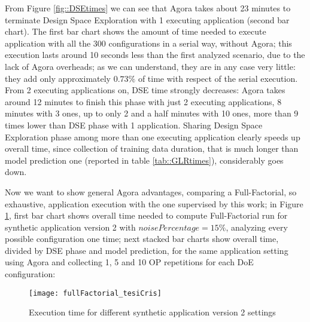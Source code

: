 From Figure \ref{fig::DSEtimes} we can see that Agora takes about 23 minutes to terminate Design Space Exploration with 1 executing application (second bar chart). The first bar chart shows the amount of time needed to execute application with all the 300 configurations in a serial way, without Agora; this execution lasts around 10 seconds less than the first analyzed scenario, due to the lack of Agora overheads; as we can understand, they are in any case very little: they add only approximately $0.73\%$ of time with respect of the serial execution. From 2 executing applications on, DSE time strongly decreases: Agora takes around 12 minutes to finish this phase with just 2 executing applications, 8 minutes with 3 ones, up to only 2 and a half minutes with 10 ones, more than 9 times lower than DSE phase with 1 application. Sharing Design Space Exploration phase among more than one executing application clearly speeds up overall time, since collection of training data duration, that is much longer than model prediction one (reported in table \ref{tab::GLRtimes}), considerably goes down.

Now we want to show general Agora advantages, comparing a Full-Factorial, so exhaustive, application execution with the one supervised by this work; in Figure \ref{fig::full_cris}, first bar chart shows overall time needed to compute Full-Factorial run for synthetic application version 2 with $noisePercentage = 15\%$, analyzing every possible configuration one time; next stacked bar charts show overall time, divided by DSE phase and model prediction, for the same application setting using Agora and collecting 1, 5 and 10 OP repetitions for each DoE configuration:

\begin{figure}[htb]

    \centering
    \texttt{[image: fullFactorial\_tesiCris]}
    \caption{Execution time for different synthetic application version 2 settings}
    \label{fig::full_cris}
    
\end{figure}

